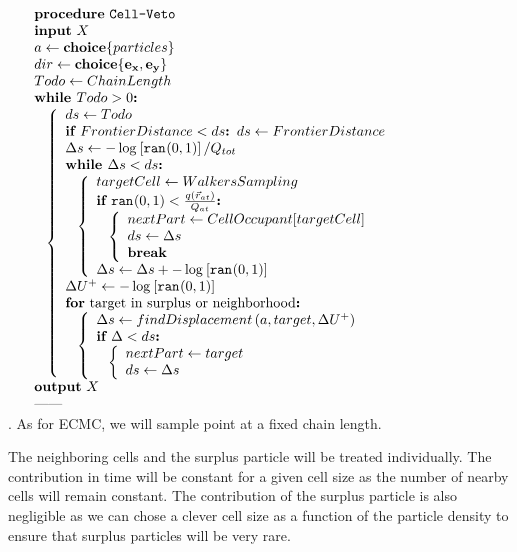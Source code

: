 \documentclass[jcp,twocolumn,longbibliography,superscriptaddress]{revtex4-2}
\begin{document}
	\begin{algorithm}[htb]
		\newcommand{\algo}{Cell-Veto}
		\captionsetup{margin=0pt,justification=raggedright}
		\begin{center}
			$\begin{array}{ll}
				& \PROCEDURE{\algo}\\
				& \INPUT{X}\\
				& \IS{a}{\CHOICE{particles}}\\
				& \IS{dir}{\CHOICE{\VEC{e_x},\VEC{e_y}}}\\
				& \IS{Todo}{ChainLength}\\
				& \WHILE{Todo > 0}\\
				& \BRACE{
					\IS{ds}{Todo}\\
					\IF{FrontierDistance < ds} \IS{ds}{FrontierDistance}\\
					\IS{\Delta s}{-\fraca{\logc{\ranb{0, 1}}}{Q_{tot}}}\\
					\WHILE{\Delta s < ds}\\
					\BRACE{
						\IS{targetCell}{WalkersSampling}\\
						\IF{\ranb{0,1} < \fracb{q(\vec{r}_{at})}{Q_{at}}}\\
						\BRACE{
							\IS{nextPart}{CellOccupant[targetCell]}\\
							\IS{ds}{\Delta s}\\
							\BREAK
						}\\
					\IS{\Delta s}{\Delta s + -\logc{\ranb{0, 1}}}
					}\\
					\IS{\Delta U^+}{-\logc{\ranb{0, 1}}}\\
					\FOR{\text{target in surplus or neighborhood}}\\
					\BRACE{
						\IS{\Delta s}{findDisplacement\glb a,target,\Delta U^+\grb}\\
						\IF{\Delta < ds}\\
						\BRACE{
							\IS{nextPart}{target}\\
							\IS{ds}{\Delta s}
						}\\
					}\\
				}\\
				& \OUTPUT{X}\\
				& \ENDPROCEDURE\
			\end{array}$
		\end{center}
		\caption{\sub{\algo}. As for ECMC, we will sample point at a fixed chain length.}
		\label{alg:\algo}
	\end{algorithm}
	
	The neighboring cells and the surplus particle will be treated individually. The contribution in time will be constant for a given cell size as the number of nearby cells will remain constant. The contribution of the surplus particle is also negligible as we can chose a clever cell size as a function of the particle density to ensure that surplus particles will be very rare.\\
	
\end{document}
